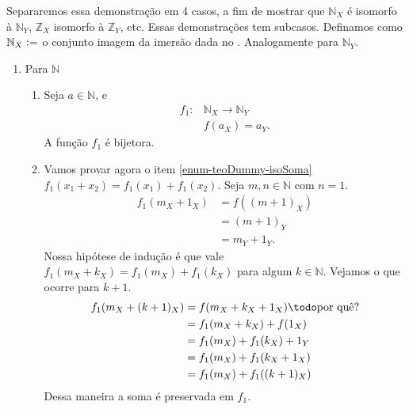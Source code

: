 \documentclass[../main.tex]{subfiles}
\begin{document}
\begin{dem}
    Separaremos essa demonstração em 4 casos, a fim de mostrar que $\mathbb{N}_X$ é isomorfo à $\mathbb{N}_Y$, $\mathbb{Z}_X$ isomorfo à $\mathbb{Z}_Y$, etc. Essas demonstrações tem subcasos.
    Definamos como $\mathbb{N}_X \vcentcolon= $ o conjunto imagem da imersão dada no . Analogamente para $\mathbb{N}_Y$.
    
\begin{enumerate}
    \item Para $\mathbb{N}$
        \begin{enumerate}
            \item 
                Seja $a \in \mathbb{N}$, e
                \begin{align}
                    f_1 \colon &\mathbb{N}_X \to \mathbb{N}_Y \\
                    & f(a_X) = a_Y.
                \end{align}
                A função $f_1$ é bijetora.  \\
            
            \item
                Vamos provar agora o item \ref{enum-teoDummy-isoSoma} $f_1(x_1 + x_2) = f_1(x_1) + f_1(x_2)$. Seja $m,n \in \mathbb{N}$ com $n=1$. \\
                \begin{align*}
                    f_1(m_X+1_X) 
                    &= f((m+1)_X) \\
                    &= (m+1)_Y \\
                    &= m_Y + 1_Y.
                \end{align*}
                Nossa hipótese de indução é que vale $f_1(m_X + k_X) = f_1(m_X) + f_1(k_X)$ para algum $k \in \mathbb{N}$. Vejamos o que ocorre para $k+1$. \\
                \begin{align*}
                    f_1(m_X + (k+1)_X) 
                    &= f(m_X + k_X + 1_X) \todoAlign{por quê?} \\
                    &= f_1(m_X + k_X) + f(1_X)  \\
                    &= f_1(m_X) + f_1(k_X) + 1_Y \\
                    &= f_1(m_X) + f_1(k_X + 1_X) \\
                    &= f_1(m_X) + f_1((k+1)_X)      
                \end{align*}        
                Dessa maneira a soma é preservada em $f_1$.


\end{enumerate}
\end{enumerate}
\end{dem}
\end{document}
